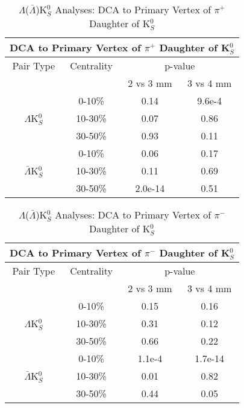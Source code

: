 \documentclass[../AnalysisNoteJBuxton.tex]{subfiles}
\begin{document}
\begin{table}
 \centering
 \begin{tabular}{|c|c|c|c|}
 \multicolumn{4}{c}{DCA to Primary Vertex of $\pi^{+}$ Daughter of K$^{0}_{S}$} \\
  \hline
  Pair Type & Centrality & \multicolumn{2}{c|}{p-value} \\
  \cline{3-4}
   & & 2 vs 3 mm & 3 vs 4 mm \\
  \hline
   & 0-10\% & 0.14 & 9.6e-4 \\
  $\Lambda$K$^{0}_{S}$ 
   & 10-30\% & 0.07 & 0.86 \\
   & 30-50\% & 0.93 & 0.11 \\
  \hline
   & 0-10\% & 0.06 & 0.17 \\
  $\bar{\Lambda}$K$^{0}_{S}$ 
   & 10-30\% & 0.11 & 0.69 \\
   & 30-50\% & 2.0e-14 & 0.51 \\
  \hline
 \end{tabular}
 \caption{$\Lambda$($\bar{\Lambda}$)K$^{0}_{S}$ Analyses: DCA to Primary Vertex of $\pi^{+}$ Daughter of K$^{0}_{S}$}
 \label{tab:DcaToPrimVertexPosPionDaughtOfK0LamK0}
\end{table}

\begin{table}
 \centering
 \begin{tabular}{|c|c|c|c|}
 \multicolumn{4}{c}{DCA to Primary Vertex of $\pi^{-}$ Daughter of K$^{0}_{S}$} \\
  \hline
  Pair Type & Centrality & \multicolumn{2}{c|}{p-value} \\
  \cline{3-4}
   & & 2 vs 3 mm & 3 vs 4 mm \\
  \hline
   & 0-10\% & 0.15 & 0.16 \\
  $\Lambda$K$^{0}_{S}$ 
   & 10-30\% & 0.31 & 0.12 \\
   & 30-50\% & 0.66 & 0.22 \\
  \hline
   & 0-10\% & 1.1e-4 & 1.7e-14 \\
  $\bar{\Lambda}$K$^{0}_{S}$ 
   & 10-30\% & 0.01 & 0.82 \\
   & 30-50\% & 0.44 & 0.05 \\
  \hline
 \end{tabular}
 \caption{$\Lambda$($\bar{\Lambda}$)K$^{0}_{S}$ Analyses: DCA to Primary Vertex of $\pi^{-}$ Daughter of K$^{0}_{S}$}
 \label{tab:DcaToPrimVertexNegPionDaughtOfK0LamK0}
\end{table}
\end{document}
